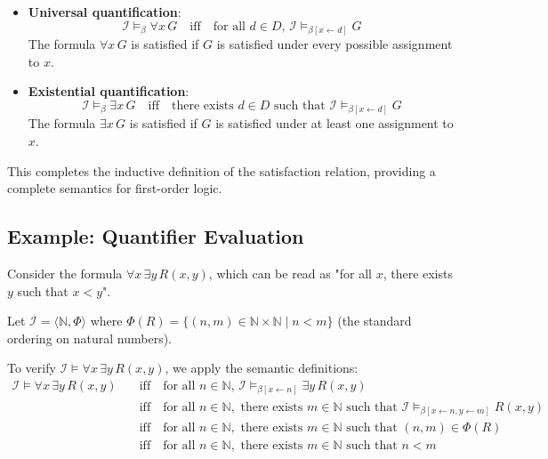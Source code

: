 \documentclass[11pt,a4paper]{article}
\theoremstyle{definition}
\theoremstyle{plain}
\theoremstyle{remark}
\newcommand{\N}{\mathbb{N}}
\begin{document}
\begin{itemize}
    \item \textbf{Universal quantification}: 
    \[
    \mathcal{I} \models_\beta \forall x \, G \quad \text{iff} \quad \text{for all } d \in D, \, \mathcal{I} \models_{\beta[x \leftarrow d]} G
    \]
    The formula $\forall x \, G$ is satisfied if $G$ is satisfied under every possible assignment to $x$.
    
    \item \textbf{Existential quantification}: 
    \[
    \mathcal{I} \models_\beta \exists x \, G \quad \text{iff} \quad \text{there exists } d \in D \text{ such that } \mathcal{I} \models_{\beta[x \leftarrow d]} G
    \]
    The formula $\exists x \, G$ is satisfied if $G$ is satisfied under at least one assignment to $x$.
\end{itemize}

This completes the inductive definition of the satisfaction relation, providing a complete semantics for first-order logic.

\subsection{Example: Quantifier Evaluation}

Consider the formula $\forall x \, \exists y \, R(x, y)$, which can be read as "for all $x$, there exists $y$ such that $x < y$".

Let $\mathcal{I} = \langle \N, \Phi \rangle$ where $\Phi(R) = \{(n, m) \in \N \times \N \mid n < m\}$ (the standard ordering on natural numbers).

To verify $\mathcal{I} \models \forall x \, \exists y \, R(x, y)$, we apply the semantic definitions:
\begin{align*}
\mathcal{I} \models \forall x \, \exists y \, R(x, y) 
&\quad \text{iff} \quad \text{for all } n \in \N, \, \mathcal{I} \models_{\beta[x \leftarrow n]} \exists y \, R(x, y) \\
&\quad \text{iff} \quad \text{for all } n \in \N, \text{ there exists } m \in \N \text{ such that } \mathcal{I} \models_{\beta[x \leftarrow n, y \leftarrow m]} R(x, y) \\
&\quad \text{iff} \quad \text{for all } n \in \N, \text{ there exists } m \in \N \text{ such that } (n, m) \in \Phi(R) \\
&\quad \text{iff} \quad \text{for all } n \in \N, \text{ there exists } m \in \N \text{ such that } n < m
\end{align*}
\end{document}
